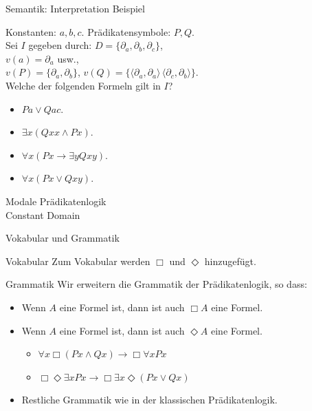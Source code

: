 \documentclass[12pt]{beamer}
\begin{document}

\begin{frame}{Semantik: Interpretation Beispiel}

  Konstanten: $a, b, c$. Prädikatensymbole: $P, Q$. \\
  Sei $I$ gegeben durch: $D = \{\partial_a, \partial_b, \partial_c\}$,\\
  $v(a) = \partial_a$ usw., \\
  $v(P) = \{\partial_a, \partial_b\}$, $v(Q) = \{\langle \partial_a, \partial_a \rangle\, \langle \partial_c, \partial_b \rangle \}$.\\
  Welche der folgenden Formeln gilt in $I$?

  \pause

  \begin{itemize}[<+->]
  \item $Pa \lor Qac$.
  \item $\exists x (Qxx \land Px)$.
  \item $\forall x (Px \to \exists y Qxy)$.
  \item $\forall x (Px \lor Qxy).$
  \end{itemize}

\end{frame}


\begin{frame}
  \Huge Modale Prädikatenlogik\\
  \large Constant Domain
\end{frame}

\begin{frame}{Vokabular und Grammatik}
  \begin{block}{Vokabular}
    Zum Vokabular werden $\Box$ und $\Diamond$ hinzugefügt.
  \end{block}

  \pause
  \begin{block}{Grammatik}
    Wir erweitern die Grammatik der Prädikatenlogik, so dass: \pause
    \begin{itemize}[<+->]
    \item Wenn $A$ eine Formel ist, dann ist auch $\Box A$ eine
      Formel.
    \item Wenn $A$ eine Formel ist, dann ist auch $\Diamond A$ eine
      Formel.
      \begin{itemize}
      \item $\forall x \Box (Px \land Qx) \to \Box \forall x Px$
      \item
        $\Box \Diamond \exists x Px \to \Box \exists x \Diamond (Px
        \lor Qx)$
      \end{itemize}
    \item Restliche Grammatik wie in der klassischen Prädikatenlogik.
    \end{itemize}
  \end{block}

\end{frame}
\end{document}
